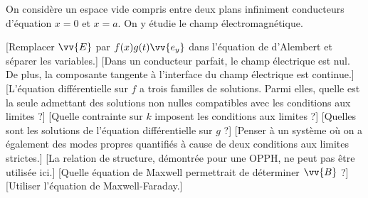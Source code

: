On considère un espace vide compris entre deux plans infiniment conducteurs d'équation $x=0$ et $x=a$. On y étudie le champ électromagnétique.
\begin{enumerate}
    [Remplacer $\vv{E}$ par $f(x)g(t)\vv{e_y}$ dans l'équation de d'Alembert et séparer les variables.]
    [Dans un conducteur parfait, le champ électrique est nul. De plus, la composante tangente à l'interface du champ électrique est continue.]
    [L'équation différentielle sur $f$ a trois familles de solutions. Parmi elles, quelle est la seule admettant des solutions non nulles compatibles avec les conditions aux limites ?]
    [Quelle contrainte sur $k$ imposent les conditions aux limites ?]
    [Quelles sont les solutions de l'équation différentielle sur $g$ ?]
    [Penser à un système où on a également des modes propres quantifiés à cause de deux conditions aux limites strictes.]
    [La relation de structure, démontrée pour une OPPH, ne peut pas être utilisée ici.]
    [Quelle équation de Maxwell permettrait de déterminer $\vv{B}$ ?]
    [Utiliser l'équation de Maxwell-Faraday.]
\end{enumerate}
